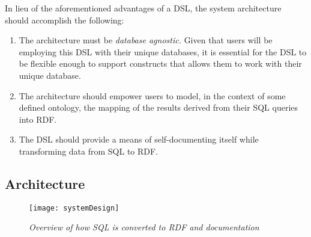 In lieu of the aforementioned advantages of a DSL, the system architecture should accomplish the following:

\begin{enumerate}
\item The architecture must be \textit{database agnostic.}  Given that users will be employing this DSL with their unique databases, it is essential for the DSL to be flexible enough to support constructs that allows them to work with their unique database.
\item The architecture should empower users to model, in the context of some defined ontology, the mapping of the results derived from their SQL queries into RDF.
\item The DSL should provide a means of self-documenting itself while transforming data from SQL to RDF.
\end{enumerate}

\subsection{Architecture}
\begin{figure}[H]
  \centering
  \texttt{[image: systemDesign]}
  \caption{\textit{Overview of how SQL is converted to RDF and documentation}}
  \label{fig:layered-arch}
  \centering
\end{figure}


    


